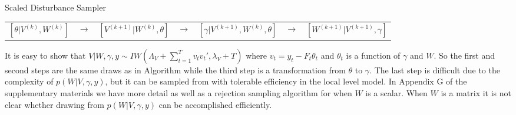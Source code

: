 \documentclass[12pt]{article}
\begin{document}
\begin{alg*}[SD]Scaled Disturbance Sampler\label{alg:DLMdist}
{\small
\begin{center}
\begin{tabular}{lllllll}
$[\theta|V^{(k)},W^{(k)}]$ & $\to$ & $[V^{(k+1)}|W^{(k)},\theta]$ & $\to$ & $[\gamma|V^{(k+1)},W^{(k)},\theta]$ & $\to$ & $[W^{(k+1)}|V^{(k+1)},\gamma]$
\end{tabular}
\end{center}
}
\end{alg*}
\noindent
It is easy to show that $V|W,\gamma,y \sim IW\left(\Lambda_V + \sum_{t=1}^Tv_tv_t',\lambda_V + T\right)$ where $v_t = y_t - F_t\theta_t$ and $\theta_t$ is a function of $\gamma$ and $W$. So the first and second steps are the same draws as in Algorithm  while the third step is a transformation from $\theta$ to $\gamma$. The last step is difficult due to the complexity of $p(W|V,\gamma,y)$, but it can be sampled from with tolerable efficiency in the local level model. In Appendix G of the supplementary materials we have more detail as well as a rejection sampling algorithm for when $W$ is a scalar. When $W$ is a matrix it is not clear whether drawing from $p(W|V,\gamma,y)$ can be accomplished efficiently.
\end{document}

